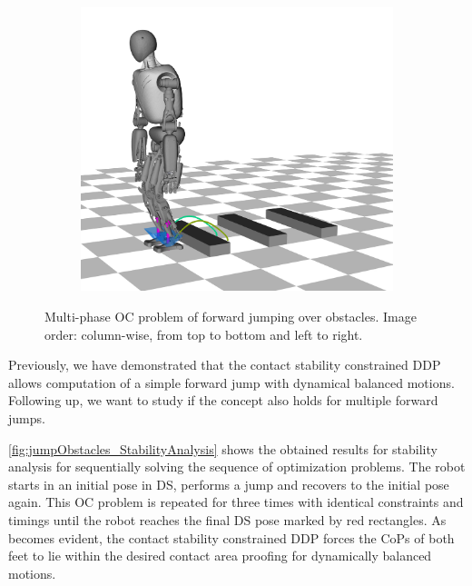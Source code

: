 \begin{figure}[h!]
\begin{subfigure}{.33\textwidth}
	\includegraphics[width=1\linewidth]{fig/jumpObstacles/snaps/7x}
	\caption{}
\end{subfigure}%
\caption[Multi-phase \gls{OC} problem of forward jumping over obstacles]{Multi-phase \gls{OC} problem of forward jumping over obstacles. Image order: column-wise, from top to bottom and left to right.}
\label{fig:jumpObstacles_Snaps}
\end{figure} 

Previously, we have demonstrated that the contact stability constrained \gls{DDP} allows computation of a simple forward jump with dynamical balanced motions. Following up, we want to study if the concept also holds for multiple forward jumps. 

\cref{fig:jumpObstacles_StabilityAnalysis} shows the obtained results for stability analysis for sequentially solving the sequence of optimization problems. The robot starts in an initial pose in \gls{DS}, performs a jump and recovers to the initial pose again. This \gls{OC} problem is repeated for three times with identical constraints and timings until the robot reaches the final \gls{DS} pose marked by red rectangles. As becomes evident, the contact stability constrained \gls{DDP} forces the \gls{CoP}s of both feet to lie within the desired contact area proofing for dynamically balanced motions. 

